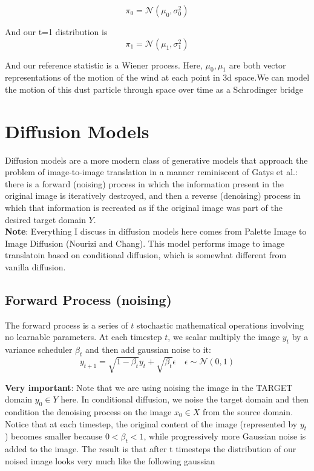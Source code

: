 \documentclass[12pt]{article}
\begin{document}
\[\pi_0 = \mathcal{N}(\mu_0, \sigma_0^2)\]

And our t=1 distribution is 
\[\pi_1 = \mathcal{N}(\mu_1, \sigma_1^2)\]

And our reference statistic is a Wiener process. Here, \(\mu_0, \mu_1\) are both vector representations of the motion of the wind at each point in 3d space.We can model the motion of this dust particle through space over time as a Schrodinger bridge

\section{Diffusion Models}

Diffusion models are a more modern class of generative models that approach the problem of image-to-image translation in a manner reminiscent of Gatys et al.: there is a forward (noising) process in which the information present in the original image is iteratively destroyed, and then a reverse (denoising) process in which that information is recreated as if the original image was part of the desired target domain \(Y\). \\

\textbf{Note}: Everything I discuss in diffusion models here comes from Palette Image to Image Diffusion (Nourizi and Chang). This model performs image to image translatoin based on conditional diffusion, which is somewhat different from vanilla diffusion. 

\subsection{Forward Process (noising)}
The forward process is a series of \(t\) stochastic mathematical operations involving no learnable parameters. At each timestep \(t\), we scalar multiply the image \(y_{t}\) by a variance scheduler \(\beta_{t}\) and then add gaussian noise to it:
\[y_ {t+1} = \sqrt{1-\beta_t}y_{t} + \sqrt{\beta_t}\epsilon \quad \epsilon \sim \mathcal{N}(0,1)\]

\textbf{Very important}: Note that we are using noising the image in the TARGET domain \(y_0 \in Y\) here. In conditional diffusion, we noise the target domain and then condition the denoising process on the image \(x_0 \in X\) from the source domain. \\

Notice that at each timestep, the original content of the image (represented by \(y_t\)) becomes smaller because \(0 < \beta_t < 1\), while progressively more Gaussian noise is added to the image. The result is that after t timesteps the distribution of our noised image looks very much like the following gaussian
\end{document}
